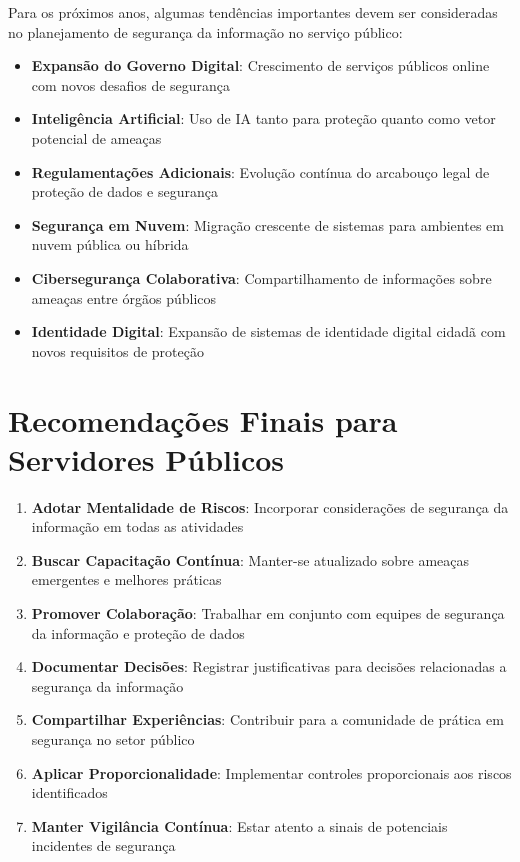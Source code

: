 \documentclass[12pt,a4paper]{report}
\begin{document}
Para os próximos anos, algumas tendências importantes devem ser consideradas no planejamento de segurança da informação no serviço público:

\begin{itemize}
  \item \textbf{Expansão do Governo Digital}: Crescimento de serviços públicos online com novos desafios de segurança
  \item \textbf{Inteligência Artificial}: Uso de IA tanto para proteção quanto como vetor potencial de ameaças
  \item \textbf{Regulamentações Adicionais}: Evolução contínua do arcabouço legal de proteção de dados e segurança
  \item \textbf{Segurança em Nuvem}: Migração crescente de sistemas para ambientes em nuvem pública ou híbrida
  \item \textbf{Cibersegurança Colaborativa}: Compartilhamento de informações sobre ameaças entre órgãos públicos
  \item \textbf{Identidade Digital}: Expansão de sistemas de identidade digital cidadã com novos requisitos de proteção
\end{itemize}

\section{Recomendações Finais para Servidores Públicos}

\begin{enumerate}
  \item \textbf{Adotar Mentalidade de Riscos}: Incorporar considerações de segurança da informação em todas as atividades
  \item \textbf{Buscar Capacitação Contínua}: Manter-se atualizado sobre ameaças emergentes e melhores práticas
  \item \textbf{Promover Colaboração}: Trabalhar em conjunto com equipes de segurança da informação e proteção de dados
  \item \textbf{Documentar Decisões}: Registrar justificativas para decisões relacionadas a segurança da informação
  \item \textbf{Compartilhar Experiências}: Contribuir para a comunidade de prática em segurança no setor público
  \item \textbf{Aplicar Proporcionalidade}: Implementar controles proporcionais aos riscos identificados
  \item \textbf{Manter Vigilância Contínua}: Estar atento a sinais de potenciais incidentes de segurança
\end{enumerate}
\end{document}
